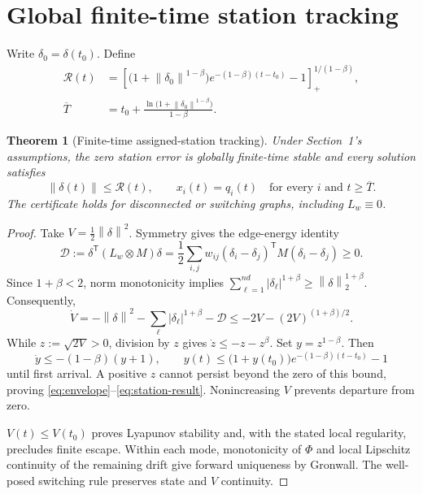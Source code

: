 \documentclass[11pt,a4paper]{article}
\newtheorem{theorem}{Theorem}
\theoremstyle{remark}
\newcommand{\norm}[1]{\left\lVert#1\right\rVert}
\newcommand{\pos}[1]{\left[#1\right]_{+}}
\newcommand{\transpose}{^{\mathsf T}}
\newcommand{\env}{\mathcal R}
\newcommand{\Dnet}{\mathcal D}
\begin{document}
\section{Global finite-time station tracking}

Write $\delta_0=\delta(t_0)$. Define
\begin{align}
\env(t)&=\pos{\bigl(1+\norm{\delta_0}^{1-\beta}\bigr)
 e^{-(1-\beta)(t-t_0)}-1}^{1/(1-\beta)},
\label{eq:envelope}\\
\overline T&=t_0+\frac{\ln\!\bigl(1+\norm{\delta_0}^{1-\beta}\bigr)}{1-\beta}.
\label{eq:deadline}
\end{align}

\begin{theorem}[Finite-time assigned-station tracking]
Under Section~1's assumptions, the zero station error is globally finite-time stable and every solution satisfies
\begin{equation}
\norm{\delta(t)}\le\env(t),\qquad
x_i(t)=q_i(t)\quad\text{for every }i\text{ and }t\ge\overline T.
\label{eq:station-result}
\end{equation}
The certificate holds for disconnected or switching graphs, including $L_w\equiv0$.
\end{theorem}
\begin{proof}
Take $V=\tfrac12\norm{\delta}^2$. Symmetry gives the edge-energy identity
\begin{equation}
\Dnet:=\delta\transpose(L_w\otimes M)\delta
=\frac12\sum_{i,j}w_{ij}(\delta_i-\delta_j)\transpose
 M(\delta_i-\delta_j)\ge0.
\label{eq:energy}
\end{equation}
Since $1+\beta<2$, norm monotonicity implies
$\sum_{\ell=1}^{nd}|\delta_\ell|^{1+\beta}\ge\norm{\delta}_2^{1+\beta}$.
Consequently,
\begin{equation}
\dot V=-\norm{\delta}^2-\sum_\ell|\delta_\ell|^{1+\beta}-\Dnet
\le-2V-(2V)^{(1+\beta)/2}.
\label{eq:station-dissipation}
\end{equation}
While $z:=\sqrt{2V}>0$, division by $z$ gives $\dot z\le-z-z^\beta$.
Set $y=z^{1-\beta}$. Then
\[
\dot y\le-(1-\beta)(y+1),\qquad
y(t)\le\bigl(1+y(t_0)\bigr)e^{-(1-\beta)(t-t_0)}-1
\]
until first arrival. A positive $z$ cannot persist beyond the zero of this bound, proving \eqref{eq:envelope}--\eqref{eq:station-result}. Nonincreasing $V$ prevents departure from zero.

$V(t)\le V(t_0)$ proves Lyapunov stability and, with the stated local regularity, precludes finite escape. Within each mode, monotonicity of $\Phi$ and local Lipschitz continuity of the remaining drift give forward uniqueness by Gronwall. The well-posed switching rule preserves state and $V$ continuity.
\end{proof}
\end{document}
